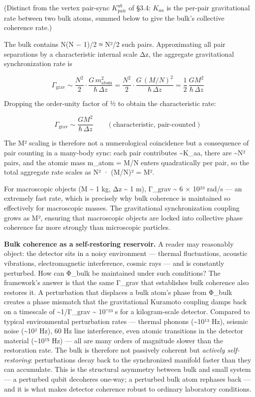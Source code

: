 \documentclass[
]{article}
\begin{document}
(Distinct from the vertex pair-sync \(K_{\text{pair}}^{ab}\) of §3.4:
\(K_{aa}\) is the per-pair gravitational rate between two bulk atoms,
summed below to give the bulk's collective coherence rate.)

The bulk contains N(N − 1)/2 ≈ N²/2 such pairs. Approximating all pair
separations by a characteristic internal scale Δz, the aggregate
gravitational synchronization rate is

\[\Gamma_{\text{grav}} \sim \frac{N^2}{2} \cdot \frac{G\, m_{\text{atom}}^2}{\hbar\, \Delta z} = \frac{N^2}{2} \cdot \frac{G\,(M/N)^2}{\hbar\, \Delta z} = \frac{1}{2}\,\frac{G M^2}{\hbar\, \Delta z}\]

Dropping the order-unity factor of ½ to obtain the characteristic rate:

\[\boxed{\Gamma_{\text{grav}} \sim \frac{G M^2}{\hbar\, \Delta z}} \qquad (\text{characteristic, pair-counted})\]

The M² scaling is therefore not a numerological coincidence but a
consequence of pair counting in a many-body sync: each pair contributes
\textasciitilde K\_aa, there are \textasciitilde N² pairs, and the
atomic mass m\_atom = M/N enters quadratically per pair, so the total
aggregate rate scales as N² · (M/N)² = M².

For macroscopic objects (M \textasciitilde{} 1 kg, Δz \textasciitilde{}
1 m), Γ\_grav \textasciitilde{} 6 × 10²³ rad/s --- an extremely fast
rate, which is precisely why bulk coherence is maintained so effectively
for macroscopic masses. The gravitational synchronization coupling grows
as M², ensuring that macroscopic objects are locked into collective
phase coherence far more strongly than microscopic particles.

\textbf{Bulk coherence as a self-restoring reservoir.} A reader may
reasonably object: the detector sits in a noisy environment --- thermal
fluctuations, acoustic vibrations, electromagnetic interference, cosmic
rays --- and is constantly perturbed. How can Φ\_bulk be maintained
under such conditions? The framework's answer is that the same Γ\_grav
that establishes bulk coherence also restores it. A perturbation that
displaces a bulk atom's phase from Φ\_bulk creates a phase mismatch that
the gravitational Kuramoto coupling damps back on a timescale of
\textasciitilde1/Γ\_grav \textasciitilde{} 10⁻²³ s for a kilogram-scale
detector. Compared to typical environmental perturbation rates ---
thermal phonons (\textasciitilde10¹³ Hz), seismic noise
(\textasciitilde10² Hz), 60 Hz line interference, even atomic
transitions in the detector material (\textasciitilde10¹⁵ Hz) --- all
are many orders of magnitude slower than the restoration rate. The bulk
is therefore not passively coherent but \emph{actively self-restoring}:
perturbations decay back to the synchronized manifold faster than they
can accumulate. This is the structural asymmetry between bulk and small
system --- a perturbed qubit decoheres one-way; a perturbed bulk atom
rephases back --- and it is what makes detector coherence robust to
ordinary laboratory conditions.
\end{document}
